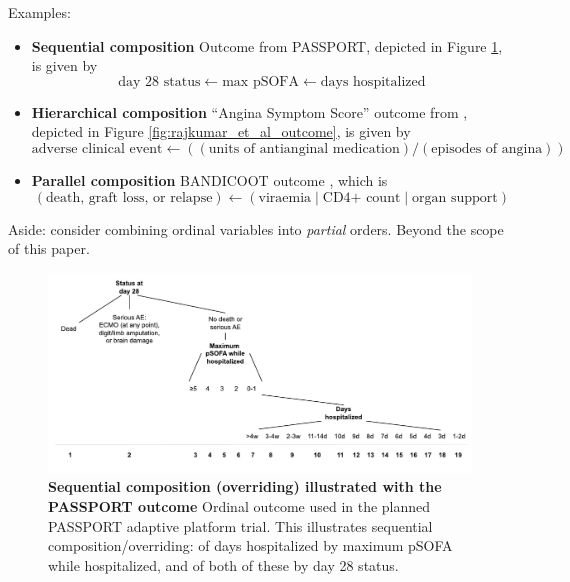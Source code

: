 \documentclass[
  11pt,
  fleqn
]{article}
\begin{document}
Examples:

\begin{itemize}
  \item \textbf{Sequential composition} Outcome from PASSPORT,
    depicted in Figure
    \ref{fig:passport_outcome}, is given by
    \[ \text{day 28 status} \leftarrow \text{max pSOFA}
      \leftarrow \text{days
      hospitalized}
    \]
  \item
    \textbf{Hierarchical composition} ``Angina Symptom Score'' outcome from
    \citet{rajkumarPlaceboControlledTrialPercutaneous2023},
    depicted in Figure
    \ref{fig:rajkumar_et_al_outcome}, is given by \[
      \text{adverse clinical event} \leftarrow ((\text{units of
    antianginal medication}) / (\text{episodes of angina})) \]

  \item \textbf{Parallel composition} BANDICOOT outcome
    \citep{walkerCodesigningNovelOrdinal2025}, which is
    \[
      (\text{death, graft loss, or relapse}) \leftarrow
      (\text{viraemia} \;|\;
      \text{CD4+ count} \;|\; \text{organ support})
    \]
\end{itemize}

Aside: \citet{wittkowskiCombiningSeveralOrdinal2004} consider combining
ordinal variables into \emph{partial} orders. Beyond the scope of
this paper.

\begin{figure}
  \includegraphics[width=7in]{passport_ordinal_outcome_sequential.pdf}
  \caption{\textbf{Sequential composition (overriding) illustrated
    with the PASSPORT outcome} Ordinal outcome used in the planned
    PASSPORT adaptive
    platform trial. This illustrates sequential composition/overriding:
    of days hospitalized by maximum pSOFA while hospitalized, and of
  both of these by day 28 status.}
  \label{fig:passport_outcome}
\end{figure}
\end{document}
